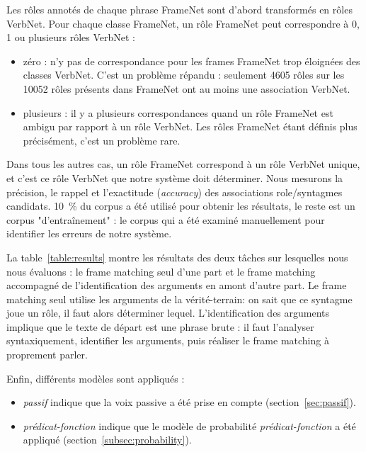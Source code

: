 Les rôles annotés de chaque phrase FrameNet sont d'abord transformés en rôles
VerbNet. Pour chaque classe FrameNet, un rôle FrameNet peut correspondre à 0, 1
ou plusieurs rôles VerbNet :

\begin{itemize}

    \item zéro : n'y pas de correspondance pour les frames FrameNet trop éloignées
    des classes VerbNet. C'est un problème répandu :  seulement 4605 rôles sur les
    10052 rôles présents dans FrameNet ont au moins une association VerbNet.

    \item plusieurs : il y a plusieurs correspondances quand un rôle FrameNet
    est ambigu par rapport à un rôle VerbNet. Les rôles FrameNet étant définis plus
    précisément, c'est un problème rare. %

\end{itemize}

Dans tous les autres cas, un rôle FrameNet correspond à un rôle VerbNet unique,
et c'est ce rôle VerbNet que notre système doit déterminer. Nous mesurons la
précision, le rappel et l'exactitude (\emph{accuracy}) des associations
role/syntagmes candidats. 10~\% du corpus a été utilisé pour obtenir les
résultats, le reste est un corpus "d'entraînement" : le corpus qui a été
examiné manuellement pour identifier les erreurs de notre système.

La table~\ref{table:results} montre les résultats des deux tâches sur
lesquelles nous nous évaluons : le frame matching seul d'une part et le frame
matching accompagné de l'identification des arguments en amont d'autre part. Le
frame matching seul utilise les arguments de la vérité-terrain: on sait que ce
syntagme joue un rôle, il faut alors déterminer lequel. L'identification des
arguments implique que le texte de départ est une phrase brute : il faut
l'analyser syntaxiquement, identifier les arguments, puis réaliser le frame
matching à proprement parler.

Enfin, différents modèles sont appliqués :

\begin{itemize}

    \item \emph{passif} indique que la voix passive a été prise en compte
    (section~\ref{sec:passif}).

    \item \emph{prédicat-fonction} indique que le modèle de probabilité
    \emph{prédicat-fonction} a été appliqué (section~\ref{subsec:probability}).

\end{itemize}

